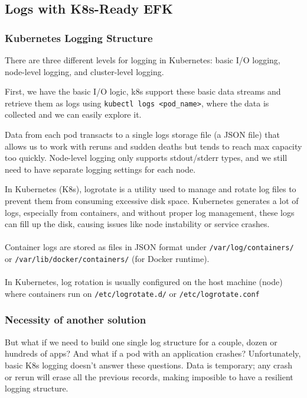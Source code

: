\documentclass{article}
\newenvironment{blocktemplate}[1]{%
    \tcolorbox[beamer,%
    noparskip,breakable,
    colframe=Blue,%
    colbacklower=LimeGreen!75!LightGreen,%
    title=#1]}%
    {\endtcolorbox}
\begin{document}
\subsection{Logs with K8s-Ready EFK}

\subsubsection{Kubernetes Logging Structure}
There are three different levels for logging in Kubernetes: basic I/O logging, node-level logging, and cluster-level logging.

First, we have the basic I/O logic, k8s support these basic data streams and retrieve them as logs using \verb|kubectl logs <pod_name>|, where the data is collected and we can easily explore it.

Data from each pod transacts to a single logs storage file (a JSON file)
that allows us to work with reruns and sudden deaths but tends 
to reach max capacity too quickly. 
Node-level logging only supports stdout/stderr types, 
and we still need to have separate logging settings for each node.

\begin{blocktemplate}{Note}
In Kubernetes (K8s), logrotate is a utility used to manage and rotate log files to prevent them from consuming excessive disk space. Kubernetes generates a lot of logs, especially from containers, and without proper log management, these logs can fill up the disk, causing issues like node instability or service crashes.
\\\\
Container logs are stored as files in JSON format under \verb|/var/log/containers/| or \verb|/var/lib/docker/containers/| (for Docker runtime).
\\\\
In Kubernetes, log rotation is usually configured on the host machine (node) where containers run on \verb|/etc/logrotate.d/| or \verb|/etc/logrotate.conf| 
\end{blocktemplate}

\subsubsection{Necessity of another solution}

But what if we need to build one single log structure for a couple, dozen or hundreds of apps? And what if a pod with an application crashes? 
Unfortunately, basic K8s logging doesn't answer these questions. 
Data is temporary; any crash or rerun will erase all the previous records, making imposible to have a resilient logging structure.
\end{document}
